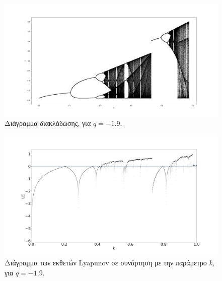 \begin{figure}[ht]
	\centering
	\includegraphics[width=1\linewidth]{LateX images/graphs q19/g1}
	\caption{ Διάγραμμα διακλάδωσης, για  $q=-1.9$.}
	\label{f:g39}
\end{figure}

\begin{figure}[ht]
	\centering
	\includegraphics[width=1\linewidth]{LateX images/graphs q19/g2}
	\caption{Διάγραμμα των εκθετών Lyapunov σε συνάρτηση με την παράμετρο \emph{k}, για  $q=-1.9$.}
	\label{f:g40}
\end{figure}

